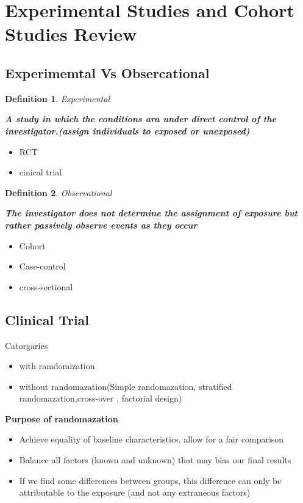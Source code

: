 \documentclass{article}
\newtheorem{definition}{Definition}
\begin{document}
\section{Experimental Studies and Cohort Studies Review}
\subsection{Experimemtal Vs Obsercational}
\begin{definition}
Experimental

\textbf{A study in which the conditions ara under direct control of the investigator.(assign individuals to exposed or unexposed)}

\end{definition}
\begin{itemize}
    \item RCT
    \item cinical trial
\end{itemize}

\begin{definition}
    Observational
    
    \textbf{The investigator does not determine the assignment of exposure but rather passively observe events as they occur}
    \end{definition}
    
    
    
    \begin{itemize}
        \item Cohort
        \item Case-control
        \item cross-sectional
    \end{itemize}


\subsection{Clinical Trial}  
Catorgaries

\begin{itemize}
    \item with ramdomization
    \item without randomazation(Simple randomazation, stratified randomazation,cross-over , factorial design)
\end{itemize}

\textbf{Purpose of randomazation}

\begin{itemize}
    \item Achieve equality of baseline characteristics, allow for a fair comparison
    \item Balance all factors (known and unknown) that may bias our final results
    \item If we find some differences between groups, this difference can only be attributable to the exposure (and not any extraneous factors)
\end{itemize}
\end{document}
